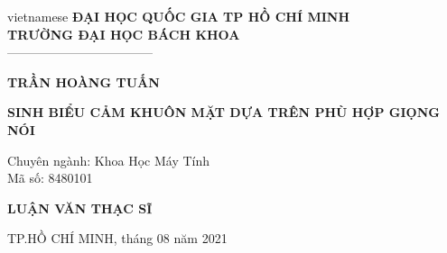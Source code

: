 \begin{titlepage}
\begin{center}

\vspace*{3\bigskipamount}

\begin{otherlanguage*}{vietnamese}
\makeatletter
\fontsize{12}{12}\textbf{ĐẠI HỌC QUỐC GIA TP HỒ CHÍ MINH}\\
\fontsize{14}{14}\textbf{TRƯỜNG ĐẠI HỌC BÁCH KHOA}\\
\fontsize{14}{14} -----------------------------------
\makeatother
\vspace{3cm}

{\makeatletter
\fontsize{16}{16}\textbf{TRẦN HOÀNG TUẤN}\\
\makeatother}
\vspace{3cm}

{\makeatletter
\fontsize{16}{16}\textbf{SINH BIỂU CẢM KHUÔN MẶT DỰA TRÊN PHÙ HỢP GIỌNG NÓI}\\
\vspace{1cm}
\begin{addmargin}[2.5em]{1em}
    \fontsize{16}{16}Chuyên ngành: Khoa Học Máy Tính\\Mã số: 8480101
\end{addmargin}
\makeatother}

\vspace{1.2cm}
{\makeatletter
\fontsize{18}{18}\textbf{LUẬN VĂN THẠC SĨ}\\
\makeatother}


\vspace{8cm}
{\makeatletter
\fontsize{12}{12} TP.HỒ CHÍ MINH, tháng 08 năm 2021\\
\makeatother}

\end{otherlanguage*}

\end{center}
\end{titlepage}
